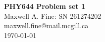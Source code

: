 \documentclass[11pt]{article}
\begin{document}
\begin{center}
    {\Large \textbf{PHY644 Problem set 1}}\\
    Maxwell A. Fine: SN 261274202 \\ 
    maxwell.fine@mail.mcgill.ca \\
    \today
\end{center}




\end{document}
